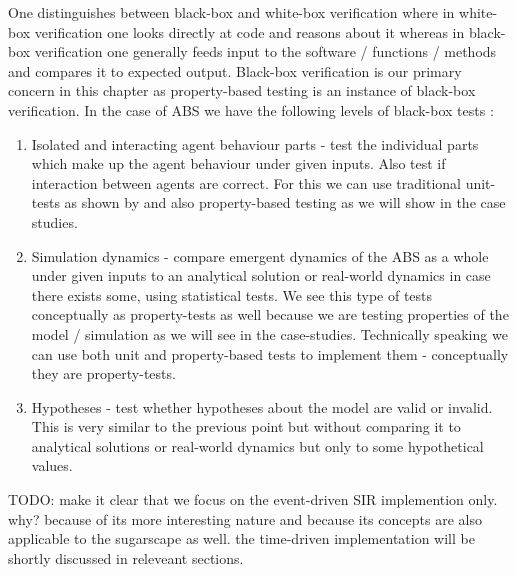 One distinguishes between black-box and white-box verification where in white-box verification one looks directly at code and reasons about it whereas in black-box verification one generally feeds input to the software / functions / methods and compares it to expected output. Black-box verification is our primary concern in this chapter as property-based testing is an instance of black-box verification. In the case of ABS we have the following levels of black-box tests \cite{nguyen_testing_2011}: %
\begin{enumerate}
	\item Isolated and interacting agent behaviour parts - test the individual parts which make up the agent behaviour under given inputs. Also test if interaction between agents are correct. For this we can use traditional unit-tests as shown by \cite{collier_test-driven_2013} and also property-based testing as we will show in the case studies.
	\item Simulation dynamics - compare emergent dynamics of the ABS as a whole under given inputs to an analytical solution or real-world dynamics in case there exists some, using statistical tests. We see this type of tests conceptually as property-tests as well because we are testing properties of the model / simulation as we will see in the case-studies. Technically speaking we can use both unit and property-based tests to implement them - conceptually they are property-tests.
	\item Hypotheses - test whether hypotheses about the model are valid or invalid. This is very similar to the previous point but without comparing it to analytical solutions or real-world dynamics but only to some hypothetical values.
\end{enumerate}

TODO: make it clear that we focus on the event-driven SIR implemention only. why? because of its more interesting nature and because its concepts are also applicable to the sugarscape as well. the time-driven implementation will be shortly discussed in releveant sections.